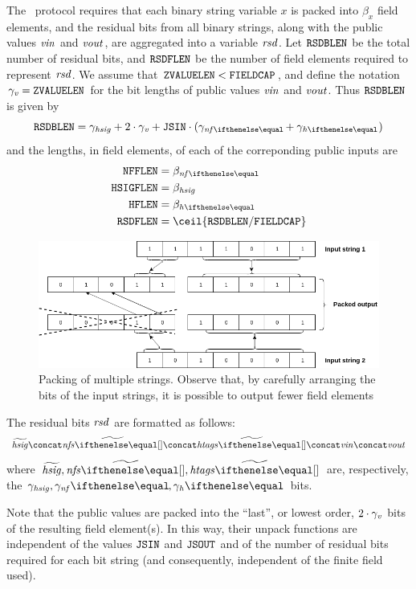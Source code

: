 The \zeth~protocol requires that each binary string variable $x$ is packed into $\beta_x$ field elements, and the residual bits from all binary strings, along with the public values $\mathit{vin}$ and $\mathit{vout}$, are aggregated into a variable $\mathit{rsd}$. Let $\mathtt{RSDBLEN}$ be the total number of residual bits, and $\mathtt{RSDFLEN}$ be the number of field elements required to represent $\mathit{rsd}$. We assume that $\mathtt{ZVALUELEN} < \mathtt{FIELDCAP}$, and define the notation $\gamma_{\mathit{v}} = \mathtt{ZVALUELEN}$ for the bit lengths of public values $\mathit{vin}$ and $\mathit{vout}$. Thus $\mathtt{RSDBLEN}$ is given by
\[
    \resBitsBLen = \gamma_\hsig + 2 \cdot \gamma_\notev + \jsin \cdot (\gamma_{\nf{}} + \gamma_{\htag{}} )
\]
and the lengths, in field elements, of each of the correponding public inputs are
\begin{align*}
    \nfFLen &= \beta_{\nf{}} \\
    \hsigFLen &= \beta_{\hsig} \\
    \htagFLen &= \beta_{\htag{}} \\
    \resBitsFLen &= \ceil{\resBitsBLen / \fieldBitCap}
\end{align*}

\begin{figure}[ht]
    \centering
    \includegraphics[width=1\textwidth]{images/bit-packing-multi-strings.png}
    \caption{Packing of multiple strings. Observe that, by carefully arranging the bits of the input strings, it is possible to output fewer field elements}\label{instantiation:fig:packing-multi-strings}
\end{figure}

The residual bits $\mathit{rsd}$ are formatted as follows:
\[
    \widetilde{\hsig} \concat \widetilde{\nfs{}} \concat \widetilde{\htags{}} \concat \vin \concat \vout
\]
where $\widetilde{\hsig}, \widetilde{\nfs{}}, \widetilde{\htags{}}$ are, respectively, the $\gamma_\hsig, \gamma_\nf{}, \gamma_\htag{}$ bits.

Note that the public values are packed into the ``last'', or lowest order, $2 \cdot \gamma_{\mathit{v}}$ bits of the resulting field element(s). In this way, their unpack functions are independent of the values $\mathtt{JSIN}$ and $\mathtt{JSOUT}$ and of the number of residual bits required for each bit string (and consequently, independent of the finite field used).


